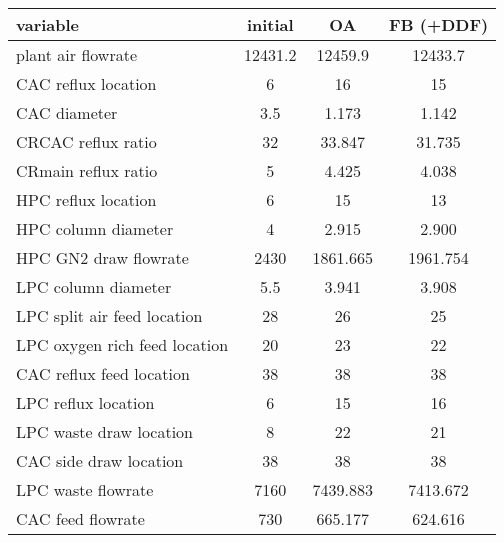 \begin{tabular}{lccc}
	variable & initial & OA & FB (+DDF) \\ \hline
	plant air flowrate & 12431.2 & 12459.9 & 12433.7 \\
    CAC reflux location & 6 & 16 & 15 \\
    CAC diameter & 3.5 & 1.173 & 1.142 \\
    CRCAC reflux ratio & 32 & 33.847 & 31.735 \\
    CRmain reflux ratio & 5 & 4.425 & 4.038 \\
    HPC reflux location & 6 & 15 & 13 \\
    HPC column diameter & 4 & 2.915 & 2.900 \\
    HPC GN2 draw flowrate & 2430 & 1861.665 & 1961.754 \\
    LPC column diameter & 5.5 & 3.941 & 3.908 \\
    LPC split air feed location & 28 & 26 & 25 \\
    LPC oxygen rich feed location & 20 & 23 & 22 \\
    CAC reflux feed location & 38 & 38 & 38 \\
    LPC reflux location & 6 & 15 & 16 \\
    LPC waste draw location & 8 & 22 & 21 \\
    CAC side draw location & 38 & 38 & 38 \\
    LPC waste flowrate  & 7160 & 7439.883 & 7413.672 \\
    CAC feed flowrate & 730 & 665.177 & 624.616 \\ \hline
\end{tabular}


